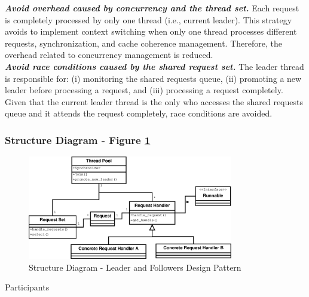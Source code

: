 \noindent \textbf{\textit{Avoid overhead caused by concurrency and the thread set.}}\textit{ }Each request is completely processed by only one thread (i.e., current leader). This strategy avoids to implement context switching when only one thread processes different requests, synchronization, and cache coherence management. Therefore, the overhead related to concurrency management is reduced.\\

\noindent \textbf{\textit{Avoid race conditions caused by the shared request set.}}\textit{ }The leader thread is responsible for: (i) monitoring the shared requests queue, (ii) promoting a new leader before processing a request, and (iii) processing a request completely. Given that the current leader thread is the only who accesses the shared requests queue and it attends the request completely, race conditions are avoided.

\subsubsection{Structure Diagram - Figure \ref{fig:str_diagram_lf}}

\begin{figure}
	\centering
	\includegraphics*[width=0.8\textwidth, keepaspectratio=false]{fig/image16.eps}
	\caption{Structure Diagram - Leader and Followers Design Pattern}
	\label{fig:str_diagram_lf}
\end{figure}

\begin{description}
	\item[Participants]
\end{description}

